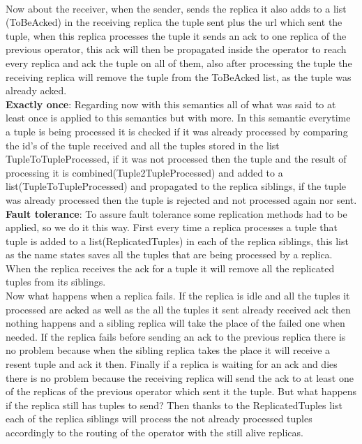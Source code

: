 \documentclass[times, 10pt, twocolumn]{article}
\begin{document}
\\Now about the receiver, when the sender, sends the replica it also adds to a list (ToBeAcked) in the receiving replica the tuple sent plus the url which sent the tuple, when this replica processes the tuple it sends an ack to one replica of the previous operator, this ack will then be propagated inside the operator to reach every replica and ack the tuple on all of them, also after processing the tuple the receiving replica will remove the tuple from the ToBeAcked list, as the tuple was already acked.
\\\textbf{Exactly once}: Regarding now with this semantics all of what was said to at least once is applied to this semantics but with more. In this semantic everytime a tuple is being processed it is checked if it was already processed by comparing the id's of the tuple received and all the tuples stored in the list TupleToTupleProcessed, if it was not processed then the tuple and the result of processing it is combined(Tuple2TupleProcessed) and added to a list(TupleToTupleProcessed) and propagated to the replica siblings, if the tuple was already processed then the tuple is rejected and not processed again nor sent.
\\\textbf{Fault tolerance}: To assure fault tolerance some replication methods had to be applied, so we do it this way. First every time a replica processes a tuple that tuple is added to a list(ReplicatedTuples) in each of the replica siblings, this list as the name states saves all the tuples that are being processed by a replica. When the replica receives the ack for a tuple it will remove all the replicated tuples from its siblings.
\\Now what happens when a replica fails. If the replica is idle and all the tuples it processed are acked as well as the all the tuples it sent already received ack then nothing happens and a sibling replica will take the place of the failed one when needed. If the replica fails before sending an ack to the previous replica there is no problem because when the sibling replica takes the place it will receive a resent tuple and ack it then. Finally if a replica is waiting for an ack and dies there is no problem because the receiving replica will send the ack to at least one of the replicas of the previous operator which sent it the tuple. But what happens if the replica still has tuples to send? Then thanks to the ReplicatedTuples list each of the replica siblings will process the not already processed tuples accordingly to the routing of the operator with the still alive replicas.
\end{document}
